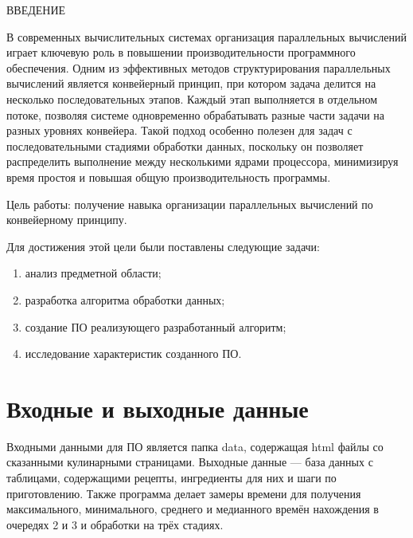 \begin{center}
    \MakeUppercase{Введение}
\end{center}

В современных вычислительных системах организация параллельных вычислений играет ключевую роль в повышении производительности программного обеспечения. Одним из эффективных методов структурирования параллельных вычислений является конвейерный принцип, при котором задача делится на несколько последовательных этапов. Каждый этап выполняется в отдельном потоке, позволяя системе одновременно обрабатывать разные части задачи на разных уровнях конвейера. Такой подход особенно полезен для задач с последовательными стадиями обработки данных, поскольку он позволяет распределить выполнение между несколькими ядрами процессора, минимизируя время простоя и повышая общую производительность программы.
\vspace{0.25cm}

Цель работы: получение навыка организации параллельных вычислений по конвейерному принципу.

\vspace{0.25cm}
Для достижения этой цели были поставлены следующие задачи:

\begin{enumerate}

\item анализ предметной области;
\item разработка алгоритма обработки данных;
\item создание ПО реализующего разработанный алгоритм;
\item исследование характеристик созданного ПО.

\end{enumerate}

\section{Входные и выходные данные}

\hspace{1.25cm}
Входными данными для ПО является папка data, содержащая html файлы со сказанными кулинарными страницами. Выходные данные --- база данных с таблицами, содержащими рецепты, ингредиенты для них и шаги по приготовлению. Также программа делает замеры времени для получения максимального, минимального, среднего и медианного времён нахождения в очередях 2 и 3 и обработки на трёх стадиях.

